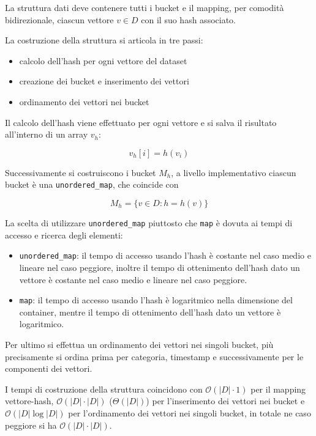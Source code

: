 La struttura dati deve contenere tutti i bucket e il mapping, per comodità bidirezionale,
ciascun vettore $v\in D$ con il suo hash associato.

La costruzione della struttura si articola in tre passi:
\begin{itemize}
    \item calcolo dell'hash per ogni vettore del dataset
    \item creazione dei bucket e inserimento dei vettori
    \item ordinamento dei vettori nei bucket
\end{itemize}

Il calcolo dell'hash viene effettuato per ogni vettore e si salva il risultato 
all'interno di un array $v_h$:

$$v_h[i] = h(v_i)$$

Successivamente si costruiscono i bucket $M_h$, a livello implementativo ciascun bucket 
è una \texttt{unordered\_map}, che coincide con 

$$M_h = \{v\in D : h = h(v)\}$$

\begin{nota}
    La scelta di utilizzare \texttt{unordered\_map} piuttosto che \texttt{map} è dovuta ai tempi di 
    accesso e ricerca degli elementi:
    \begin{itemize}
        \item \texttt{unordered\_map}: il tempo di accesso usando l'hash è costante 
        nel caso medio e lineare nel caso peggiore, inoltre il tempo di ottenimento dell'hash 
        dato un vettore è costante nel caso medio e lineare nel caso peggiore. \cite{unsorted_map_index}\cite{unsorted_map_find}
        \item \texttt{map}: il tempo di accesso usando l'hash è logaritmico nella dimensione 
        del container, mentre il tempo di ottenimento dell'hash dato un vettore è
        logaritmico. \cite{map_index}\cite{map_find}
    \end{itemize}
\end{nota}

Per ultimo si effettua un ordinamento dei vettori nei singoli bucket, più precisamente
si ordina prima per categoria, timestamp e successivamente per le componenti dei vettori.

I tempi di costruzione della struttura coincidono con $\mathcal{O}(|D|\cdot 1)$
per il mapping vettore-hash, $\mathcal{O}(|D|\cdot |D|)$ ($\Theta(|D|)$) per l'inserimento 
dei vettori nei bucket e $\mathcal{O}(|D|\log |D|)$ per l'ordinamento dei vettori 
nei singoli bucket, in totale ne caso peggiore si ha $\mathcal{O}(|D|\cdot |D|)$.

